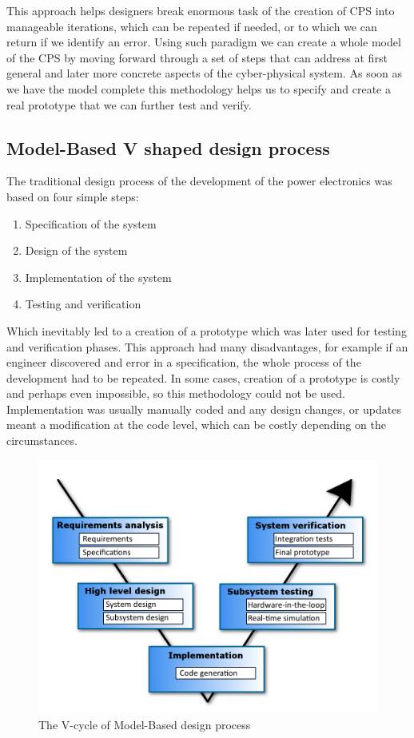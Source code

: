\documentclass[english,technical,10pt]{FITreport}[2018/01/26]
\begin{document}
This approach helps designers break enormous task of the creation of CPS into manageable iterations, which can be repeated if needed, or to which we can return if we identify an error. Using such paradigm we can create a whole model of the CPS by moving forward through a set of steps that can address at first general and later more concrete aspects of the cyber-physical system. As soon as we have the model complete this methodology helps us to specify and create a real prototype that we can further test and verify.

\subsection{Model-Based V shaped design process}

The traditional design process of the development of the power electronics was based on four simple steps:

\begin{enumerate}
\item Specification of the system
\item Design of the system
\item Implementation of the system
\item Testing and verification
\end{enumerate}

Which inevitably led to a creation of a prototype which was later used for testing and verification phases. This approach had many disadvantages, for example if an engineer discovered and error in a specification, the whole process of the development had to be repeated. In some cases, creation of a prototype is costly and perhaps even impossible, so this methodology could not be used. Implementation was usually manually coded and any design changes, or updates meant a modification at the code level, which can be costly depending on the circumstances.

\begin{figure}
\centering
\includegraphics[scale=0.35]{pictures/model_based_design_Vcycle.png}
\caption{The V-cycle of Model-Based design process}
\label{fig:modelBasedDesignProcess}
\end{figure}
\end{document}
